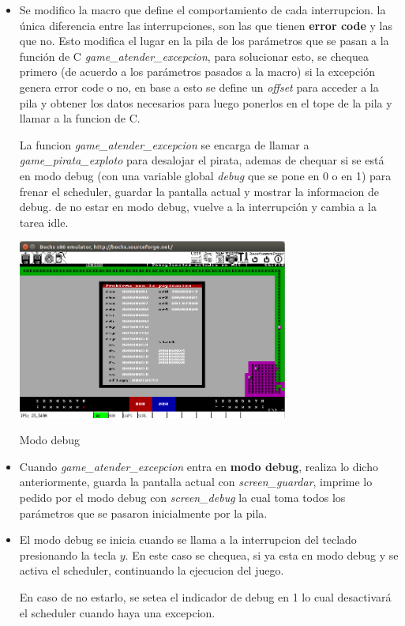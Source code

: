 \begin{itemize}
\item Se modifico la macro que define el comportamiento de cada interrupcion. la
 única diferencia entre las interrupciones, son las que tienen {\bf error code} y las
  que no. Esto modifica el lugar en la pila de los parámetros que se pasan a la
  función de C {\it game_atender_excepcion\/}, para solucionar esto, se chequea primero
  (de acuerdo a los parámetros pasados a la macro)
  si la excepción genera error code o no, en base a esto se define un {\it offset\/}
  para acceder a la pila y obtener los datos necesarios para luego ponerlos en
  el tope de la pila y llamar a la funcion de C.

  La funcion {\it game_atender_excepcion\/} se encarga de llamar a {\it game_pirata_exploto\/}
  para desalojar el pirata, ademas de chequar si se está en modo debug (con una
  variable global {\it debug\/} que se pone en 0 o en 1) para frenar el scheduler, guardar la
  pantalla actual y mostrar la informacion de debug. de no estar
  en modo debug, vuelve a la interrupción y cambia a la tarea idle.

  \begin{center}
  \includegraphics[width=0.7\textwidth]{imagenes/mapa2.png}

  Modo debug
  \end{center}

\item Cuando {\it game_atender_excepcion\/} entra en {\bf modo debug}, realiza lo dicho
anteriormente, guarda la pantalla actual con {\it screen_guardar\/}, imprime lo pedido
por el modo debug con {\it screen_debug\/} la cual toma todos los parámetros que se
pasaron inicialmente por la pila.

\item El modo debug se inicia cuando se llama a la interrupcion del teclado
   presionando la tecla $y$. En este caso se chequea, si ya esta en modo
  debug y se activa el scheduler, continuando la ejecucion del juego.

   En caso de no estarlo, se setea el indicador de debug en 1 lo cual desactivará
  el scheduler cuando haya una excepcion.
\end{itemize}

